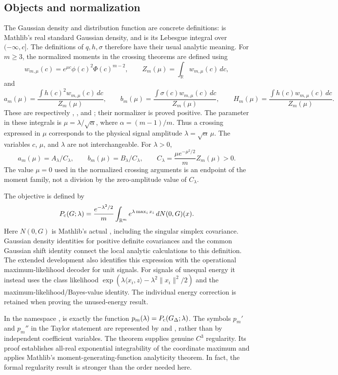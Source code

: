 \subsection{Objects and normalization}\label{lv:objects}
The Gaussian density and distribution function are concrete definitions:
 is Mathlib's real standard Gaussian density, and
 is its Lebesgue integral over $(-\infty,c]$.
The definitions of $q,h,\sigma$ therefore have their usual analytic
meaning.  For $m\geq3$, the normalized moments in the crossing theorems are
defined using
\[
 w_{m,\mu}(c)=e^{\mu c}\phi(c)^2\Phi(c)^{m-2},
 \qquad
 Z_m(\mu)=\int_{\mathbb R}w_{m,\mu}(c)\,dc,
\]
and
\[
 a_m(\mu)=\frac{\int h(c)^2w_{m,\mu}(c)\,dc}{Z_m(\mu)},\qquad
 b_m(\mu)=\frac{\int \sigma(c)w_{m,\mu}(c)\,dc}{Z_m(\mu)},\qquad
 H_m(\mu)=\frac{\int h(c)w_{m,\mu}(c)\,dc}{Z_m(\mu)}.
\]
These are respectively , , and
; their normalizer is proved positive.  The parameter
in these integrals is $\mu=\lambda/\sqrt{\alpha}$, where
$\alpha=(m-1)/m$.  Thus a crossing expressed in $\mu$ corresponds to the
physical signal amplitude $\lambda=\sqrt{\alpha}\,\mu$.  The variables
$c$, $\mu$, and $\lambda$ are not interchangeable.  For $\lambda>0$,
\[
 a_m(\mu)=A_\lambda/C_\lambda,\qquad
 b_m(\mu)=B_\lambda/C_\lambda,\qquad
 C_\lambda=\frac{\mu e^{-\mu^2/2}}{m}Z_m(\mu)>0.
\]
The value $\mu=0$ used in the normalized crossing arguments is an endpoint
of the moment family, not a division by the zero-amplitude value of
$C_\lambda$.

The objective  is defined by
\[
 P_{\mathrm c}(G;\lambda)=\frac{e^{-\lambda^2/2}}{m}
 \int_{\mathbb R^m}e^{\lambda\max_i x_i}\,dN(0,G)(x).
\]
Here $N(0,G)$ is Mathlib's actual
, including the singular
simplex covariance.  Gaussian density identities for positive definite
covariances and the common Gaussian shift identity connect the local
analytic calculations to this definition.  The extended development also identifies this expression with the
operational maximum-likelihood decoder for unit signals.  For signals
of unequal energy it instead uses the class likelihood
$\exp(\lambda\langle x_i,z\rangle-\lambda^2\|x_i\|^2/2)$ and the
maximum-likelihood/Bayes-value identity.  The individual energy correction
is retained when proving the unused-energy result.

In the namespace ,
 is exactly the function
$p_m(\lambda)=P_{\mathrm c}(G_\Delta;\lambda)$.  The symbols $p_m'$ and $p_m''$
in the Taylor statement are represented by  and
, rather than by independent
coefficient variables.  The theorem
 supplies genuine $C^3$
regularity.  Its proof establishes all-real exponential integrability
of the coordinate maximum and applies Mathlib's moment-generating-function
analyticity theorem.  In fact, the formal regularity result is stronger
than the order needed here.

